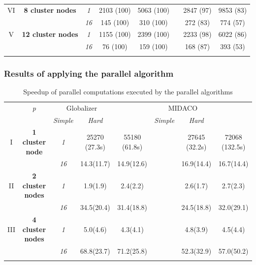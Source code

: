 \documentclass[aspectratio=1610]{beamer}
\begin{document}
\begin{frame}
\begin{table}
\begin{tabular}{cccccccc}
  VI & \textbf{8 cluster nodes} %
    & \textit{1}  & 2103 (100) & 5063 (100) & & 2847 (97) & 9853 (83)\\
  & & \textit{16} & 145 (100)  & 310 (100)  & & 272 (83) & 774 (57)\\
      \hline \noalign{\smallskip}
  V & \textbf{12 cluster nodes} %
    & \textit{1}  & 1155 (100) & 2399 (100) & & 2233 (98) & 6022 (86) \\
  & & \textit{16} & 76 (100)  & 159 (100)  & & 168 (87) & 393 (53)\\
      \noalign{\smallskip}\hline
    \end{tabular}
  \end{table}
\end{frame}

\begin{frame}
  \frametitle{Results of applying the parallel algorithm}
  \begin{table}
    \centering
    \caption{Speedup of parallel computations executed by the parallel algorithms}
    \label{tab:speedup}
    \begin{tabular}{cccccccc}
      \cline{3-8}\noalign{\smallskip}
      \multicolumn{2}{c}{  } & \textit{p} & \multicolumn{2}{c}{Globalizer} & &
  \multicolumn{2}{c}{MIDACO}   \\
      \noalign{\smallskip} \cline{4-5} \cline{7-8}  \noalign{\smallskip}
      \multicolumn{2}{c}{  } & & \textit{Simple} & \textit{Hard} & & \textit{Simple} &
  \textit{Hard}  \\
      \noalign{\smallskip}\hline
  I  & \textbf{1 cluster node}  %
      & \textit{1}   & 25270 (27.3s) & 55180 (61.8s) & & 27645 (32.2s) & 72068 (132.5s)  \\
    &  & \textit{16} & 14.3(11.7) & 14.9(12.6)  & &  16.9(14.4) & 16.7(14.4) \\
    \hline \noalign{\smallskip}
  II  & \textbf{2 cluster nodes}  %
    & \textit{1}      &   1.9(1.9) & 2.4(2.2)  & & 2.6(1.7) & 2.7(2.3) \\
    &   & \textit{16} & 34.5(20.4) & 31.4(18.8) & & 24.5(18.8) & 32.0(29.1) \\
      \noalign{\smallskip}\hline	\noalign{\smallskip}
  III  & \textbf{4 cluster nodes}  %
  & \textit{1}      & 5.0(4.6) & 4.3(4.1) & & 4.8(3.9) & 4.5(4.4) \\
  &   & \textit{16} & 68.8(23.7) & 71.2(25.8) & & 52.3(32.9) & 57.0(50.2) \\
    \noalign{\smallskip}\hline	\noalign{\smallskip}

\end{tabular}
\end{table}
\end{frame}
\end{document}
